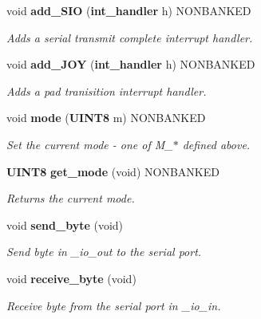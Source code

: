 \begin{CompactItemize}
\item 
void {\bf add\_\-SIO} ({\bf int\_\-handler} h) NONBANKED
\begin{CompactList}\small\item\em Adds a serial transmit complete interrupt handler.\item\end{CompactList}

\item 
void {\bf add\_\-JOY} ({\bf int\_\-handler} h) NONBANKED
\begin{CompactList}\small\item\em Adds a pad tranisition interrupt handler.\item\end{CompactList}

\item 
\label{gb.h_a63}
void {\bf mode} ({\bf UINT8} m) NONBANKED
\begin{CompactList}\small\item\em Set the current mode - one of M\_\-$\ast$ defined above.\item\end{CompactList}

\item 
\label{gb.h_a64}
{\bf UINT8} {\bf get\_\-mode} (void) NONBANKED
\begin{CompactList}\small\item\em Returns the current mode.\item\end{CompactList}

\item 
\label{gb.h_a65}
void {\bf send\_\-byte} (void)
\begin{CompactList}\small\item\em Send byte in \_\-io\_\-out to the serial port.\item\end{CompactList}

\item 
\label{gb.h_a66}
void {\bf receive\_\-byte} (void)
\begin{CompactList}\small\item\em Receive byte from the serial port in \_\-io\_\-in.\item\end{CompactList}


\end{CompactItemize}
